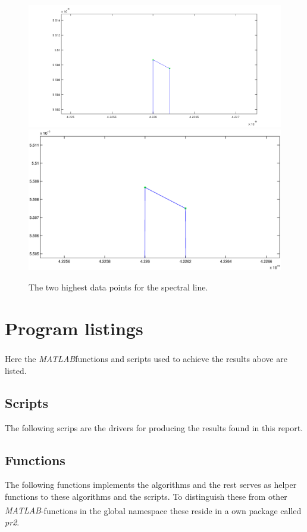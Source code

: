 \documentclass[10pt, a4paper]{article}
\newcommand{\matlab}{\small{\emph{MATLAB\textsuperscript{\textregistered}}}}
\begin{document}
\begin{figure}[hbt]
\begin{center}
\ifpdf
	\includegraphics[width=\linewidth]{../img/peak6.png}
\else
	\includegraphics[width=\linewidth]{../img/peak6.eps}
\fi
\end{center}
\caption{The two highest data points for the spectral line.}
\label{fig:peak6}
\end{figure}

\clearpage

\section{Program listings} \label{appendix:programs}
Here the \matlab functions and scripts used to achieve the results above are listed.

\subsection{Scripts}
The following scrips are the drivers for producing the results found in this report.



\subsection{Functions}
The following functions implements the algorithms and the rest serves as helper functions to these algorithms and the scripts. To distinguish these from other \matlab-functions in the global namespace these reside in a own package called \emph{pr2}.


\end{document}
